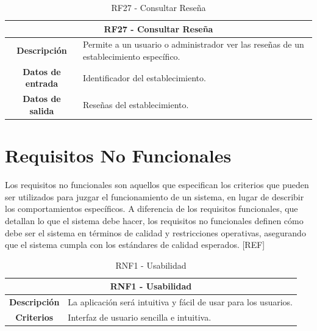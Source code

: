 \begin{table}[H]
    \centering
    \begin{tabular}{|c|p{10cm}|}
        \hline
        \multicolumn{2}{|c|}{\textbf{RF27 - Consultar Reseña}}                                                             \\
        \hline
        \textbf{Descripción}      & Permite a un usuario o administrador ver las reseñas de un establecimiento específico. \\
        \hline
        \textbf{Datos de entrada} & Identificador del establecimiento.                                                     \\
        \hline
        \textbf{Datos de salida}  & Reseñas del establecimiento.                                                           \\
        \hline
    \end{tabular}
    \caption{RF27 - Consultar Reseña}
\end{table}

\section{Requisitos No Funcionales}

Los requisitos no funcionales son aquellos que especifican los criterios que pueden ser utilizados para juzgar el funcionamiento de un sistema, en lugar de describir los comportamientos específicos. A diferencia de los requisitos funcionales, que detallan lo que el sistema debe hacer, los requisitos no funcionales definen cómo debe ser el sistema en términos de calidad y restricciones operativas, asegurando que el sistema cumpla con los estándares de calidad esperados. [REF]

\begin{table}[H]
    \centering
    \begin{tabular}{|c|p{10cm}|}
        \hline
        \multicolumn{2}{|c|}{\textbf{RNF1 - Usabilidad}}                                       \\
        \hline
        \textbf{Descripción} & La aplicación será intuitiva y fácil de usar para los usuarios. \\
        \hline
        \textbf{Criterios}   & Interfaz de usuario sencilla e intuitiva.                       \\
        \hline
    \end{tabular}
    \caption{RNF1 - Usabilidad}
\end{table}

